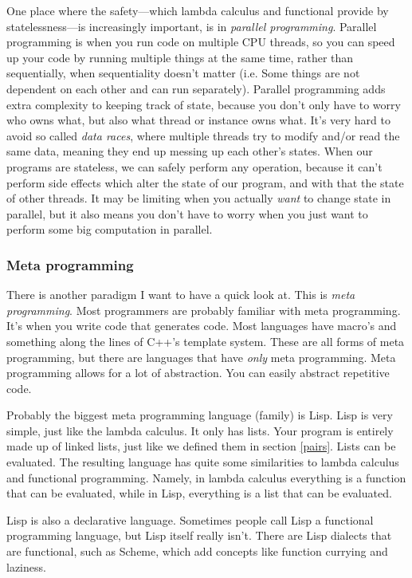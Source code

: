 \documentclass[11pt]{article}
\begin{document}
One place where the safety---which lambda calculus and functional provide by
statelessness---is increasingly important, is in \emph{parallel programming}.
Parallel programming is when you run code on multiple CPU threads, so you can
speed up your code by running multiple things at the same time, rather than
sequentially, when sequentiality doesn't matter (i.e. Some things are not
dependent on each other and can run separately). Parallel programming adds
extra complexity to keeping track of state, because you don't only have to
worry who owns what, but also what thread or instance owns what. It's very hard
to avoid so called \emph{data races}, where multiple threads try to modify
and/or read the same data, meaning they end up messing up each other's states.
When our programs are stateless, we can safely perform any operation, because
it can't perform side effects which alter the state of our program, and with
that the state of other threads. It may be limiting when you actually
\emph{want} to change state in parallel, but it also means you don't have to
worry when you just want to perform some big computation in parallel.

\subsubsection{Meta programming}\label{metaprogramming}

There is another paradigm I want to have a quick look at. This is \emph{meta
programming}. Most programmers are probably familiar with meta programming.
It's when you write code that generates code. Most languages have macro's and
something along the lines of C++'s template system. These are all forms of meta
programming, but there are languages that have \emph{only} meta programming.
Meta programming allows for a lot of abstraction. You can easily abstract
repetitive code.

Probably the biggest meta programming language (family) is Lisp. Lisp is very
simple, just like the lambda calculus. It only has lists. Your program is
entirely made up of linked lists, just like we defined them in section
\ref{pairs}. Lists can be evaluated. The resulting language has quite some
similarities to lambda calculus and functional programming. Namely, in lambda
calculus everything is a function that can be evaluated, while in Lisp,
everything is a list that can be evaluated.

Lisp is also a declarative language. Sometimes people call Lisp a functional
programming language, but Lisp itself really isn't. There are Lisp dialects
that are functional, such as Scheme, which add concepts like function currying
and laziness.
\end{document}
